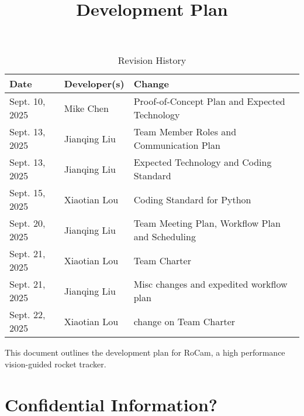 \documentclass{article}
\title{Development Plan\\\progname}
\author{\authname}
\date{}
\begin{document}
\maketitle

\begin{table}[hp]
  \caption{Revision History} \label{TblRevisionHistory}
  \begin{tabularx}{\textwidth}{llX}
    \toprule
    \textbf{Date}  & \textbf{Developer(s)} & \textbf{Change}                                 \\
    \midrule
    Sept. 10, 2025 & Mike Chen             & Proof-of-Concept Plan and Expected Technology   \\
    Sept. 13, 2025 & Jianqing Liu          & Team Member Roles and Communication Plan        \\
    Sept. 13, 2025 & Jianqing Liu          & Expected Technology and Coding Standard         \\
    Sept. 15, 2025 & Xiaotian Lou          & Coding Standard for Python                      \\
    Sept. 20, 2025 & Jianqing Liu          & Team Meeting Plan, Workflow Plan and Scheduling \\
    Sept. 21, 2025 & Xiaotian Lou          & Team Charter                                    \\
    Sept. 21, 2025 & Jianqing Liu          & Misc changes and expedited workflow plan        \\
    Sept. 22, 2025 & Xiaotian Lou          & change on Team Charter                          \\
    \bottomrule
  \end{tabularx}
\end{table}

\newpage{}

This document outlines the development plan for RoCam, a high performance
vision-guided rocket tracker.



\section{Confidential Information?}
\end{document}
